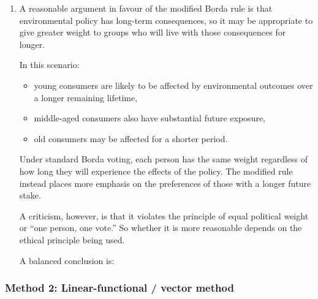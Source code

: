\documentclass[12pt]{article}
\begin{document}
\begin{enumerate}[label=(\alph*)]
    Hence
    \[
    \boxed{\text{Standard Borda chooses }Y,\qquad \text{Modified Borda chooses }Z.}
    \]

    \item
    A reasonable argument in favour of the modified Borda rule is that environmental policy has long-term consequences, so it may be appropriate to give greater weight to groups who will live with those consequences for longer.

    In this scenario:
    \begin{itemize}[leftmargin=*]
        \item young consumers are likely to be affected by environmental outcomes over a longer remaining lifetime,
        \item middle-aged consumers also have substantial future exposure,
        \item old consumers may be affected for a shorter period.
    \end{itemize}

    Under standard Borda voting, each person has the same weight regardless of how long they will experience the effects of the policy. The modified rule instead places more emphasis on the preferences of those with a longer future stake.

    A criticism, however, is that it violates the principle of equal political weight or ``one person, one vote.'' So whether it is more reasonable depends on the ethical principle being used.

    A balanced conclusion is:
    \begin{center}
    \end{center}
\end{enumerate}

\subsubsection{Method 2: Linear-functional / vector method}
\end{document}
